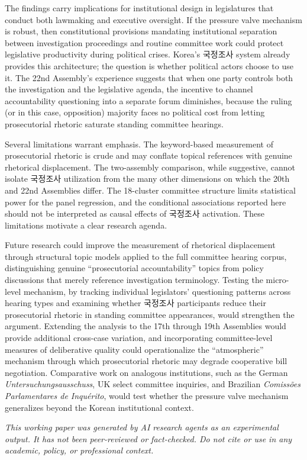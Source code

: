 \documentclass[11pt]{article}
\begin{document}
The findings carry implications for institutional design in legislatures that conduct both lawmaking and executive oversight. If the pressure valve mechanism is robust, then constitutional provisions mandating institutional separation between investigation proceedings and routine committee work could protect legislative productivity during political crises. Korea's 국정조사 system already provides this architecture; the question is whether political actors choose to use it. The 22nd Assembly's experience suggests that when one party controls both the investigation and the legislative agenda, the incentive to channel accountability questioning into a separate forum diminishes, because the ruling (or in this case, opposition) majority faces no political cost from letting prosecutorial rhetoric saturate standing committee hearings.

Several limitations warrant emphasis. The keyword-based measurement of prosecutorial rhetoric is crude and may conflate topical references with genuine rhetorical displacement. The two-assembly comparison, while suggestive, cannot isolate 국정조사 utilization from the many other dimensions on which the 20th and 22nd Assemblies differ. The 18-cluster committee structure limits statistical power for the panel regression, and the conditional associations reported here should not be interpreted as causal effects of 국정조사 activation. These limitations motivate a clear research agenda.

Future research could improve the measurement of rhetorical displacement through structural topic models applied to the full committee hearing corpus, distinguishing genuine ``prosecutorial accountability'' topics from policy discussions that merely reference investigation terminology. Testing the micro-level mechanism, by tracking individual legislators' questioning patterns across hearing types and examining whether 국정조사 participants reduce their prosecutorial rhetoric in standing committee appearances, would strengthen the argument. Extending the analysis to the 17th through 19th Assemblies would provide additional cross-case variation, and incorporating committee-level measures of deliberative quality \citep{steiner2004} could operationalize the ``atmospheric'' mechanism through which prosecutorial rhetoric may degrade cooperative bill negotiation. Comparative work on analogous institutions, such as the German \textit{Untersuchungsausschuss}, UK select committee inquiries, and Brazilian \textit{Comiss\~oes Parlamentares de Inqu\'erito}, would test whether the pressure valve mechanism generalizes beyond the Korean institutional context.

\bigskip
\noindent\textit{This working paper was generated by AI research agents as an
experimental output. It has not been peer-reviewed or fact-checked.
Do not cite or use in any academic, policy, or professional context.}



\end{document}
